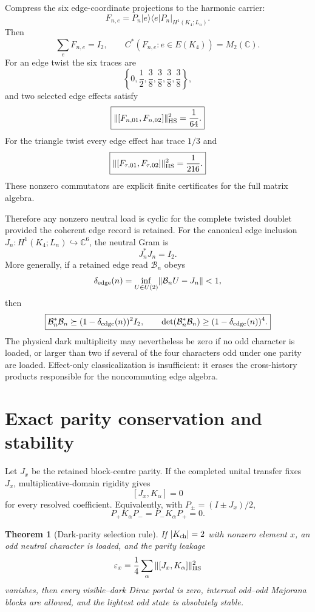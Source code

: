 \documentclass[11pt,oneside,openany]{book}
\numberwithin{equation}{chapter}
\newtheorem{theorem}{Theorem}[chapter]
\theoremstyle{definition}
\theoremstyle{remark}
\newcommand{\C}{\mathbb C}
\newcommand{\norm}[1]{\lVert #1\rVert}
\begin{document}
Compress the six edge-coordinate projections to the harmonic carrier:
\[
 F_{n,e}=P_n|e\rangle\langle e|P_n|_{H^1(K_4;L_n)}.
\]
Then
\[
 \sum_eF_{n,e}=I_2,
 \qquad
 \boxed{C^*(F_{n,e}:e\in E(K_4))=M_2(\C).}
\]
For an edge twist the six traces are
\[
 \boxed{\left\{0,\frac12,\frac38,\frac38,\frac38,\frac38\right\},}
\]
and two selected edge effects satisfy
\[
 \boxed{\norm{[F_{n,01},F_{n,02}]}_{\rm HS}^2=\frac1{64}.}
\]
For the triangle twist every edge effect has trace \(1/3\) and
\[
 \boxed{\norm{[F_{\tau,01},F_{\tau,02}]}_{\rm HS}^2=\frac1{216}.}
\]
These nonzero commutators are explicit finite certificates for the full
matrix algebra.

Therefore any nonzero neutral load is cyclic for the complete twisted doublet
provided the coherent edge record is retained.  For the canonical edge
inclusion \(J_n:H^1(K_4;L_n)\hookrightarrow\C^6\), the neutral Gram is
\[
 \boxed{J_n^*J_n=I_2.}
\]
More generally, if a retained edge read \(\mathcal B_n\) obeys
\[
 \delta_{\rm edge}(n)=\inf_{U\in U(2)}\norm{\mathcal B_nU-J_n}<1,
\]
then
\[
 \boxed{\mathcal B_n^*\mathcal B_n\succeq
 (1-\delta_{\rm edge}(n))^2I_2,\qquad
 \det(\mathcal B_n^*\mathcal B_n)\ge
 (1-\delta_{\rm edge}(n))^4.}
\]
The physical dark multiplicity may nevertheless be zero if no odd character
is loaded, or larger than two if several of the four characters odd under one
parity are loaded.  Effect-only classicalization is insufficient: it erases
the cross-history products responsible for the noncommuting edge algebra.

\section{Exact parity conservation and stability}
Let \(J_x\) be the retained block-centre parity.  If the completed unital
transfer fixes \(J_x\), multiplicative-domain rigidity gives
\[
 [J_x,K_\alpha]=0
\]
for every resolved coefficient.  Equivalently, with
\(P_\pm=(I\pm J_x)/2\),
\[
 P_+K_\alpha P_-=P_-K_\alpha P_+=0.
\]

\begin{theorem}[Dark-parity selection rule]
\label{thm:dark-parity}
If \(|K_{\rm ch}|=2\) with nonzero element \(x\), an odd neutral character is
loaded, and the parity leakage
\[
 \varepsilon_x
 =\frac14\sum_\alpha\|[J_x,K_\alpha]\|_{\rm HS}^2
\]
vanishes, then every visible--dark Dirac portal is zero, internal odd--odd
Majorana blocks are allowed, and the lightest odd state is absolutely stable.
\end{theorem}
\end{document}

